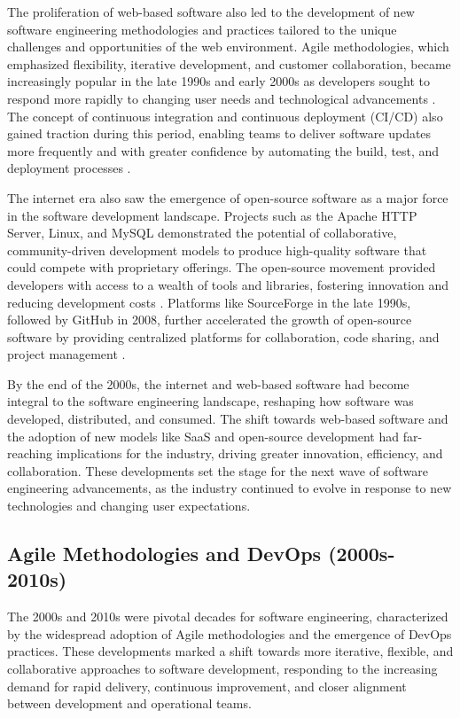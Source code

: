 \begin{refsection}
The proliferation of web-based software also led to the development of new software engineering methodologies and practices tailored to the unique challenges and opportunities of the web environment. Agile methodologies, which emphasized flexibility, iterative development, and customer collaboration, became increasingly popular in the late 1990s and early 2000s as developers sought to respond more rapidly to changing user needs and technological advancements \cite[pp.~94-97]{beck1999extreme}. The concept of continuous integration and continuous deployment (CI/CD) also gained traction during this period, enabling teams to deliver software updates more frequently and with greater confidence by automating the build, test, and deployment processes \cite[pp.~23-25]{humble2010continuous}.

The internet era also saw the emergence of open-source software as a major force in the software development landscape. Projects such as the Apache HTTP Server, Linux, and MySQL demonstrated the potential of collaborative, community-driven development models to produce high-quality software that could compete with proprietary offerings. The open-source movement provided developers with access to a wealth of tools and libraries, fostering innovation and reducing development costs \cite[pp.~61-63]{raymond2022cathedral}. Platforms like SourceForge in the late 1990s, followed by GitHub in 2008, further accelerated the growth of open-source software by providing centralized platforms for collaboration, code sharing, and project management \cite[pp.~45-48]{loeliger2012version}.

By the end of the 2000s, the internet and web-based software had become integral to the software engineering landscape, reshaping how software was developed, distributed, and consumed. The shift towards web-based software and the adoption of new models like SaaS and open-source development had far-reaching implications for the industry, driving greater innovation, efficiency, and collaboration. These developments set the stage for the next wave of software engineering advancements, as the industry continued to evolve in response to new technologies and changing user expectations.

\subsection{Agile Methodologies and DevOps (2000s-2010s)}

The 2000s and 2010s were pivotal decades for software engineering, characterized by the widespread adoption of Agile methodologies and the emergence of DevOps practices. These developments marked a shift towards more iterative, flexible, and collaborative approaches to software development, responding to the increasing demand for rapid delivery, continuous improvement, and closer alignment between development and operational teams.


\end{refsection}
